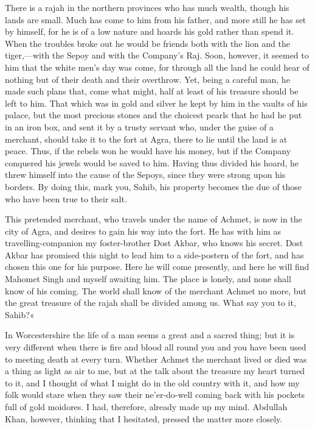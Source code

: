There is a rajah in the northern provinces who has much wealth, though his lands are small. Much has come to him from his father, and more still he has set by himself, for he is of a low nature and hoards his gold rather than spend it. When the troubles broke out he would be friends both with the lion and the tiger,—with the Sepoy and with the Company's Raj. Soon, however, it seemed to him that the white men's day was come, for through all the land he could hear of nothing but of their death and their overthrow. Yet, being a careful man, he made such plans that, come what might, half at least of his treasure should be left to him. That which was in gold and silver he kept by him in the vaults of his palace, but the most precious stones and the choicest pearls that he had he put in an iron box, and sent it by a trusty servant who, under the guise of a merchant, should take it to the fort at Agra, there to lie until the land is at peace. Thus, if the rebels won he would have his money, but if the Company conquered his jewels would be saved to him. Having thus divided his hoard, he threw himself into the cause of the Sepoys, since they were strong upon his borders. By doing this, mark you, Sahib, his property becomes the due of those who have been true to their salt.

This pretended merchant, who travels under the name of Achmet, is now in the city of Agra, and desires to gain his way into the fort. He has with him as travelling-companion my foster-brother Dost Akbar, who knows his secret. Dost Akbar has promised this night to lead him to a side-postern of the fort, and has chosen this one for his purpose. Here he will come presently, and here he will find Mahomet Singh and myself awaiting him. The place is lonely, and none shall know of his coming. The world shall know of the merchant Achmet no more, but the great treasure of the rajah shall be divided among us. What say you to it, Sahib?«

In Worcestershire the life of a man seems a great and a sacred thing; but it is very different when there is fire and blood all round you and you have been used to meeting death at every turn. Whether Achmet the merchant lived or died was a thing as light as air to me, but at the talk about the treasure my heart turned to it, and I thought of what I might do in the old country with it, and how my folk would stare when they saw their ne'er-do-well coming back with his pockets full of gold moidores. I had, therefore, already made up my mind. Abdullah Khan, however, thinking that I hesitated, pressed the matter more closely.

